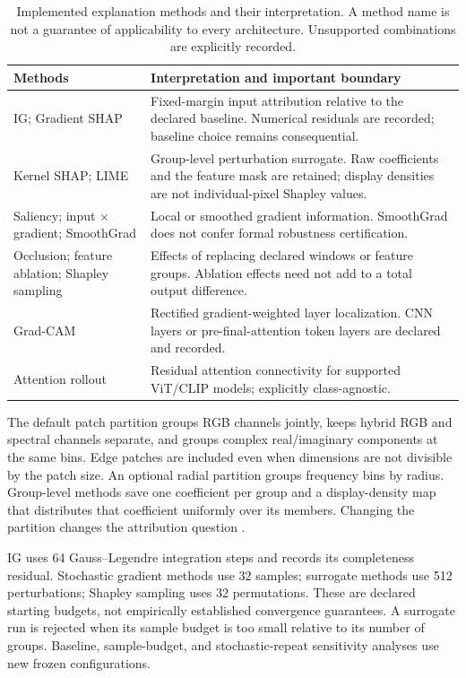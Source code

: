\documentclass[conference,10pt,letterpaper]{IEEEtran}
\begin{document}
\begin{table}[t]
\caption{Implemented explanation methods and their interpretation. A method name is not a guarantee of applicability to every architecture. Unsupported combinations are explicitly recorded.}
\label{tab:methods}
\centering\small
\begin{tabular}{@{}>{\raggedright\arraybackslash}p{.28\linewidth}>{\raggedright\arraybackslash}p{.65\linewidth}@{}}
\toprule
Methods & Interpretation and important boundary\\
\midrule
IG; Gradient SHAP & Fixed-margin input attribution relative to the declared baseline. Numerical residuals are recorded; baseline choice remains consequential.\\
Kernel SHAP; LIME & Group-level perturbation surrogate. Raw coefficients and the feature mask are retained; display densities are not individual-pixel Shapley values.\\
Saliency; input $\times$ gradient; SmoothGrad & Local or smoothed gradient information. SmoothGrad does not confer formal robustness certification.\\
Occlusion; feature ablation; Shapley sampling & Effects of replacing declared windows or feature groups. Ablation effects need not add to a total output difference.\\
Grad-CAM & Rectified gradient-weighted layer localization. CNN layers or pre-final-attention token layers are declared and recorded.\\
Attention rollout & Residual attention connectivity for supported ViT/CLIP models; explicitly class-agnostic.\\
\bottomrule
\end{tabular}
\end{table}

The default patch partition groups RGB channels jointly, keeps hybrid RGB and spectral channels separate, and groups complex real/imaginary components at the same bins. Edge patches are included even when dimensions are not divisible by the patch size. An optional radial partition groups frequency bins by radius. Group-level methods save one coefficient per group and a display-density map that distributes that coefficient uniformly over its members. Changing the partition changes the attribution question \cite{zheng2025}.

IG uses 64 Gauss--Legendre integration steps and records its completeness residual. Stochastic gradient methods use 32 samples; surrogate methods use 512 perturbations; Shapley sampling uses 32 permutations. These are declared starting budgets, not empirically established convergence guarantees. A surrogate run is rejected when its sample budget is too small relative to its number of groups. Baseline, sample-budget, and stochastic-repeat sensitivity analyses use new frozen configurations.
\end{document}
